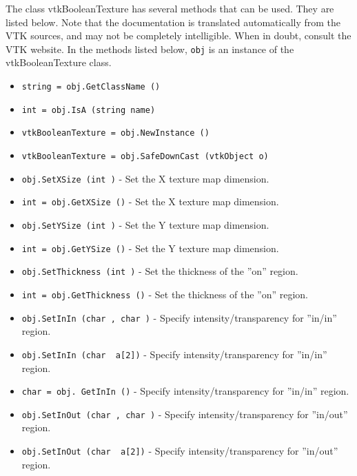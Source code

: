The class vtkBooleanTexture has several methods that can be used.
  They are listed below.
Note that the documentation is translated automatically from the VTK sources,
and may not be completely intelligible.  When in doubt, consult the VTK website.
In the methods listed below, \verb|obj| is an instance of the vtkBooleanTexture class.
\begin{itemize}
\item  \verb|string = obj.GetClassName ()|

\item  \verb|int = obj.IsA (string name)|

\item  \verb|vtkBooleanTexture = obj.NewInstance ()|

\item  \verb|vtkBooleanTexture = obj.SafeDownCast (vtkObject o)|

\item  \verb|obj.SetXSize (int )| -  Set the X texture map dimension.

\item  \verb|int = obj.GetXSize ()| -  Set the X texture map dimension.

\item  \verb|obj.SetYSize (int )| -  Set the Y texture map dimension.

\item  \verb|int = obj.GetYSize ()| -  Set the Y texture map dimension.

\item  \verb|obj.SetThickness (int )| -  Set the thickness of the ''on'' region.

\item  \verb|int = obj.GetThickness ()| -  Set the thickness of the ''on'' region.

\item  \verb|obj.SetInIn (char , char )| -  Specify intensity/transparency for ''in/in'' region.

\item  \verb|obj.SetInIn (char  a[2])| -  Specify intensity/transparency for ''in/in'' region.

\item  \verb|char = obj. GetInIn ()| -  Specify intensity/transparency for ''in/in'' region.

\item  \verb|obj.SetInOut (char , char )| -  Specify intensity/transparency for ''in/out'' region.

\item  \verb|obj.SetInOut (char  a[2])| -  Specify intensity/transparency for ''in/out'' region.


\end{itemize}
